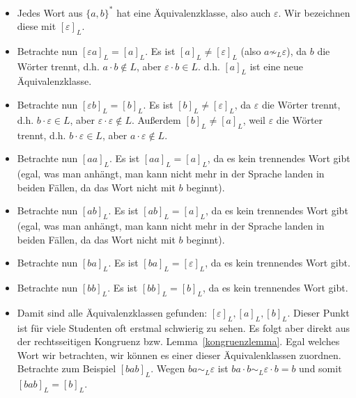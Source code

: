 \documentclass[11pt, a4paper]{article}
\theoremstyle{definition}
\theoremstyle{plain}
\begin{document}
\begin{itemize}
	\item Jedes Wort aus \( \{ a, b \}^\ast \) hat eine Äquivalenzklasse, also auch \( \varepsilon \). Wir bezeichnen diese mit \( [\varepsilon]_L \).
	\item Betrachte nun \( [\varepsilon a]_L = [a]_L \). Es ist \( [a]_L \neq [\varepsilon]_L \) (also \( a \not\sim_L \varepsilon \)), da \( b \) die Wörter trennt, d.h. \( a \cdot b \notin L \), aber \( \varepsilon \cdot b \in L \). d.h. \( [a]_L \) ist eine neue Äquivalenzklasse.
	\item Betrachte nun \( [\varepsilon b]_L = [b]_L \). Es ist \( [b]_L \neq [\varepsilon]_L \), da \( \varepsilon \) die Wörter trennt, d.h. \( b \cdot \varepsilon \in L \), aber \( \varepsilon \cdot \varepsilon \notin L \). Außerdem \( [b]_L \neq [a]_L \), weil \( \varepsilon \) die Wörter trennt, d.h. \( b \cdot \varepsilon \in L \), aber \( a \cdot \varepsilon \notin L \).
	\item Betrachte nun \( [aa]_L \). Es ist \( [aa]_L = [a]_L \), da es kein trennendes Wort gibt (egal, was man anhängt, man kann nicht mehr in der Sprache landen in beiden Fällen, da das Wort nicht mit \( b \) beginnt).
	\item Betrachte nun \( [ab]_L \). Es ist \( [ab]_L = [a]_L \), da es kein trennendes Wort gibt (egal, was man anhängt, man kann nicht mehr in der Sprache landen in beiden Fällen, da das Wort nicht mit \( b \) beginnt).
	\item Betrachte nun \( [ba]_L \). Es ist \( [ba]_L = [\varepsilon]_L \), da es kein trennendes Wort gibt.
	\item Betrachte nun \( [bb]_L \). Es ist \( [bb]_L = [b]_L \), da es kein trennendes Wort gibt.
	\item Damit sind alle Äquivalenzklassen gefunden: \( [\varepsilon]_L, [a]_L, [b]_L \). Dieser Punkt ist für viele Studenten oft erstmal schwierig zu sehen. Es folgt aber direkt aus der rechtsseitigen Kongruenz bzw. Lemma~\ref{kongruenzlemma}. Egal welches Wort wir betrachten, wir können es einer dieser Äquivalenklassen zuordnen. Betrachte zum Beispiel \( [bab]_L \). Wegen \( ba \sim_L \varepsilon \) ist \( ba \cdot b \sim_L \varepsilon \cdot b = b \) und somit \( [bab]_L = [b]_L \). 
\end{itemize}
\end{document}

